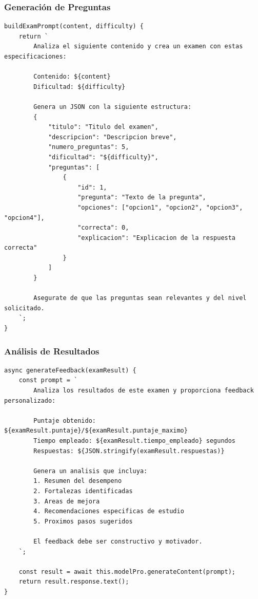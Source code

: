 \documentclass[12pt,a4paper]{report}
\begin{document}
\subsubsection{Generación de Preguntas}
\begin{lstlisting}
buildExamPrompt(content, difficulty) {
    return `
        Analiza el siguiente contenido y crea un examen con estas especificaciones:
        
        Contenido: ${content}
        Dificultad: ${difficulty}
        
        Genera un JSON con la siguiente estructura:
        {
            "titulo": "Titulo del examen",
            "descripcion": "Descripcion breve",
            "numero_preguntas": 5,
            "dificultad": "${difficulty}",
            "preguntas": [
                {
                    "id": 1,
                    "pregunta": "Texto de la pregunta",
                    "opciones": ["opcion1", "opcion2", "opcion3", "opcion4"],
                    "correcta": 0,
                    "explicacion": "Explicacion de la respuesta correcta"
                }
            ]
        }
        
        Asegurate de que las preguntas sean relevantes y del nivel solicitado.
    `;
}
\end{lstlisting}

\subsubsection{Análisis de Resultados}
\begin{lstlisting}
async generateFeedback(examResult) {
    const prompt = `
        Analiza los resultados de este examen y proporciona feedback personalizado:
        
        Puntaje obtenido: ${examResult.puntaje}/${examResult.puntaje_maximo}
        Tiempo empleado: ${examResult.tiempo_empleado} segundos
        Respuestas: ${JSON.stringify(examResult.respuestas)}
        
        Genera un analisis que incluya:
        1. Resumen del desempeno
        2. Fortalezas identificadas
        3. Areas de mejora
        4. Recomendaciones especificas de estudio
        5. Proximos pasos sugeridos
        
        El feedback debe ser constructivo y motivador.
    `;
    
    const result = await this.modelPro.generateContent(prompt);
    return result.response.text();
}
\end{lstlisting}
\end{document}

